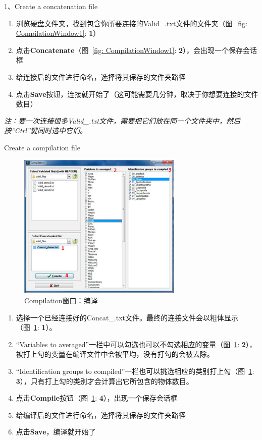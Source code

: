 \documentclass[12pt]{article}
\begin{document}
1、Create a concatenation file

\begin{enumerate}
\item 浏览硬盘文件夹，找到包含你所要连接的Valid\_.txt文件的文件夹（图~\ref{fig: CompilationWindow1}: {\color{red}\textbf{1}}）
\item 点击\textbf{Concatenate}（图~\ref{fig: CompilationWindow1}: {\color{red}\textbf{2}}），会出现一个保存会话框
\item 给连接后的文件进行命名，选择将其保存的文件夹路径
\item 点击\textbf{Save}按钮，连接就开始了（这可能需要几分钟，取决于你想要连接的文件数目）
\end{enumerate}

{\color{blue}\textit{注：要一次连接很多Valid\_.txt文件，需要把它们放在同一个文件夹中，然后按“Ctrl”键同时选中它们。}}

{\color{red}Create a compilation file}

\begin{figure}[!ht]
\centering
\includegraphics[width=0.7\textwidth]{CompilationWindow2}
\caption{Compilation窗口：编译}
\label{fig: CompilationWindow2}
\end{figure}

\begin{enumerate}
\item 选择一个已经连接好的Concat\_.txt文件。最终的连接文件会以粗体显示（图~\ref{fig: CompilationWindow2}: {\color{red}\textbf{1}}）。
\item “Variables to averaged”一栏中可以勾选也可以不勾选相应的变量（图~\ref{fig: CompilationWindow2}: {\color{red}\textbf{2}}），被打上勾的变量在编译文件中会被平均，没有打勾的会被去除。
\item “Identification groups to compiled”一栏也可以挑选相应的类别打上勾（图~\ref{fig: CompilationWindow2}: {\color{red}\textbf{3}}），只有打上勾的类别才会计算出它所包含的物体数目。
\item 点击\textbf{Compile}按钮（图~\ref{fig: CompilationWindow2}: {\color{red}\textbf{4}}），出现一个保存会话框
\item 给编译后的文件进行命名，选择将其保存的文件夹路径
\item 点击\textbf{Save}，编译就开始了
\end{enumerate}
\end{document}
